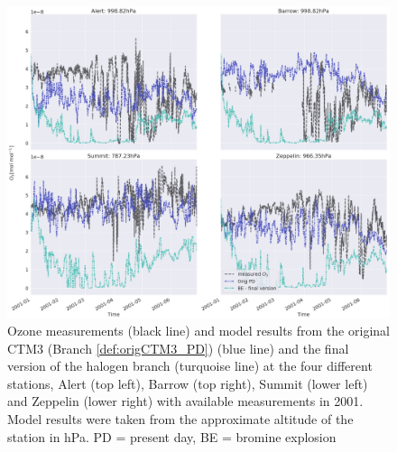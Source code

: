 \begin{figure}[h]
    \centering
    \includegraphics[width = \linewidth]{Chapter6_Results/images/ozone_stationComp_2001/ozone_2001_step5.png}
    \caption{Ozone measurements (black line) and model results from the original CTM3 (Branch \ref{def:origCTM3_PD}) (blue line) and the final version of the halogen branch (turquoise line) at the four different stations, Alert (top left), Barrow (top right), Summit (lower left) and Zeppelin (lower right) with available measurements in 2001. Model results were taken from the approximate altitude of the station in hPa. PD = present day, BE = bromine explosion}
    \label{fig:step5}
\end{figure}